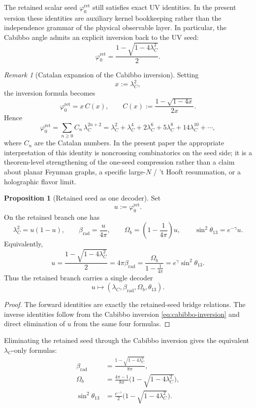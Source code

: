 \documentclass[11pt,a4paper]{article}
\theoremstyle{definition}
\newtheorem{proposition}[theorem]{Proposition}
\theoremstyle{remark}
\newtheorem*{remark}{Remark}
\newcommand{\phiz}{\varphi_0^{\mathrm{ret}}}
\begin{document}
The retained scalar seed $\phiz$ still satisfies exact UV identities. In the present version these
identities are auxiliary kernel bookkeeping rather than the independence grammar of the physical
observable layer. In particular, the Cabibbo angle admits an explicit inversion back to the UV
seed:
\begin{equation}
\label{eq:cabibbo-inversion}
\phiz=\frac{1-\sqrt{1-4\lambda_C^2}}{2}.
\end{equation}
\begin{remark}[Catalan expansion of the Cabibbo inversion]
Setting
\[
x:=\lambda_C^2,
\]
the inversion formula becomes
\[
\phiz=x\,C(x),
\qquad
C(x):=\frac{1-\sqrt{1-4x}}{2x}.
\]
Hence
\begin{equation}
\label{eq:catalan-cabibbo}
\phiz
=
\sum_{n\ge 0} C_n\,\lambda_C^{2n+2}
=
\lambda_C^2+\lambda_C^4+2\lambda_C^6+5\lambda_C^8+14\lambda_C^{10}+\cdots,
\end{equation}
where $C_n$ are the Catalan numbers. In the present paper the appropriate interpretation of this
identity is noncrossing combinatorics on the seed side; it is a theorem-level strengthening of
the one-seed compression rather than a claim about planar Feynman graphs, a specific large-$N$ /
't Hooft resummation, or a holographic flavor limit.
\end{remark}

\begin{proposition}[Retained seed as one decoder]
\label{prop:retained-seed-decoder}
Set
\[
u:=\phiz.
\]
On the retained branch one has
\[
\lambda_C^2=u(1-u),
\qquad
\beta_{\mathrm{rad}}=\frac{u}{4\pi},
\qquad
\Omega_b=\left(1-\frac{1}{4\pi}\right)u,
\qquad
\sin^2\theta_{13}=e^{-\gamma}u.
\]
Equivalently,
\[
u
=
\frac{1-\sqrt{1-4\lambda_C^2}}{2}
=
4\pi\beta_{\mathrm{rad}}
=
\frac{\Omega_b}{1-\frac{1}{4\pi}}
=
e^\gamma\sin^2\theta_{13}.
\]
Thus the retained branch carries a single decoder
\[
u\longmapsto (\lambda_C,\beta_{\mathrm{rad}},\Omega_b,\theta_{13}).
\]
\end{proposition}

\begin{proof}
The forward identities are exactly the retained-seed bridge relations. The inverse identities follow
from the Cabibbo inversion \eqref{eq:cabibbo-inversion} and direct elimination of $u$ from the same
four formulas.
\end{proof}

Eliminating the retained seed through the Cabibbo inversion gives the equivalent
$\lambda_C$-only formulas:
\begin{equation}
\label{eq:lambda-c-master}
\begin{aligned}
\beta_{\mathrm{rad}}&=\frac{1-\sqrt{1-4\lambda_C^2}}{8\pi},\\
\Omega_b&=\frac{4\pi-1}{8\pi}\bigl(1-\sqrt{1-4\lambda_C^2}\bigr),\\
\sin^2\theta_{13}&=\frac{e^{-\gamma}}{2}\bigl(1-\sqrt{1-4\lambda_C^2}\bigr).
\end{aligned}
\end{equation}
\end{document}
